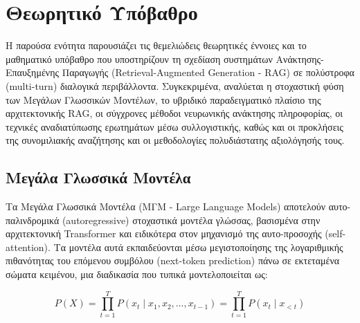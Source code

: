 \section{Θεωρητικό Υπόβαθρο}

Η παρούσα ενότητα παρουσιάζει τις θεμελιώδεις θεωρητικές έννοιες και το μαθηματικό υπόβαθρο που υποστηρίζουν τη σχεδίαση συστημάτων Ανάκτησης-Επαυξημένης Παραγωγής (Retrieval-Augmented Generation - RAG) σε πολύστροφα (multi-turn) διαλογικά περιβάλλοντα. Συγκεκριμένα, αναλύεται η στοχαστική φύση των Μεγάλων Γλωσσικών Μοντέλων, το υβριδικό παραδειγματικό πλαίσιο της αρχιτεκτονικής RAG, οι σύγχρονες μέθοδοι νευρωνικής ανάκτησης πληροφορίας, οι τεχνικές αναδιατύπωσης ερωτημάτων μέσω συλλογιστικής, καθώς και οι προκλήσεις της συνομιλιακής αναζήτησης και οι μεθοδολογίες πολυδιάστατης αξιολόγησής τους.

\subsection{Μεγάλα Γλωσσικά Μοντέλα}

Τα Μεγάλα Γλωσσικά Μοντέλα (ΜΓΜ - Large Language Models) αποτελούν αυτο-παλινδρομικά (autoregressive) στοχαστικά μοντέλα γλώσσας, βασισμένα στην αρχιτεκτονική Transformer και ειδικότερα στον μηχανισμό της αυτο-προσοχής (self-attention). Τα μοντέλα αυτά εκπαιδεύονται μέσω μεγιστοποίησης της λογαριθμικής πιθανότητας του επόμενου συμβόλου (next-token prediction) πάνω σε εκτεταμένα σώματα κειμένου, μια διαδικασία που τυπικά μοντελοποιείται ως:

\begin{equation}
P(X) = \prod_{t=1}^{T} P(x_t \mid x_1, x_2, \dots, x_{t-1}) = \prod_{t=1}^{T} P(x_t \mid x_{<t})
\end{equation}

